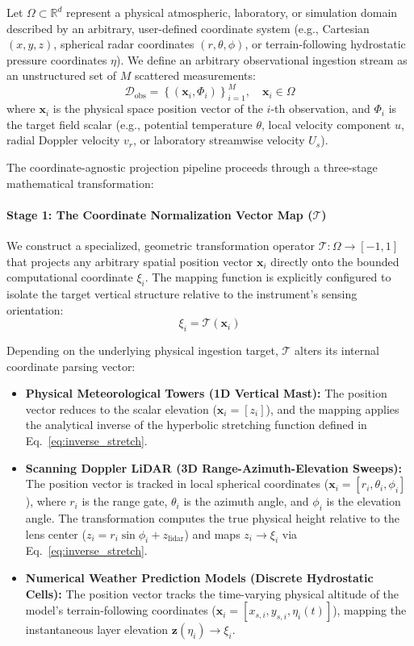 \documentclass[11pt,a4paper]{article}
\begin{document}
Let $\Omega \subset \mathbb{R}^d$ represent a physical atmospheric, laboratory, or simulation domain described by an arbitrary, user-defined coordinate system (e.g., Cartesian $(x,y,z)$, spherical radar coordinates $(r, \theta, \phi)$, or terrain-following hydrostatic pressure coordinates $\eta$). We define an arbitrary observational ingestion stream as an unstructured set of $M$ scattered measurements:
\begin{equation}
\mathcal{D}_{\mathrm{obs}} = \left\{ \left(\mathbf{x}_i, \Phi_i\right) \right\}_{i=1}^M, \quad \mathbf{x}_i \in \Omega
\label{eq:scattered_data_set}
\end{equation}
where $\mathbf{x}_i$ is the physical space position vector of the $i$-th observation, and $\Phi_i$ is the target field scalar (e.g., potential temperature $\theta$, local velocity component $u$, radial Doppler velocity $v_r$, or laboratory streamwise velocity $U_s$).

The coordinate-agnostic projection pipeline proceeds through a three-stage mathematical transformation:

\paragraph{Stage 1: The Coordinate Normalization Vector Map ($\mathcal{T}$)}
We construct a specialized, geometric transformation operator $\mathcal{T}: \Omega \rightarrow [-1, 1]$ that projects any arbitrary spatial position vector $\mathbf{x}_i$ directly onto the bounded computational coordinate $\xi_i$. The mapping function is explicitly configured to isolate the target vertical structure relative to the instrument's sensing orientation:
\begin{equation}
\xi_i = \mathcal{T}(\mathbf{x}_i)
\label{eq:generalized_tau_map}
\end{equation}

Depending on the underlying physical ingestion target, $\mathcal{T}$ alters its internal coordinate parsing vector:
\begin{itemize}
\item \textbf{Physical Meteorological Towers (1D Vertical Mast):} The position vector reduces to the scalar elevation ($\mathbf{x}_i = [z_i]$), and the mapping applies the analytical inverse of the hyperbolic stretching function defined in Eq.~\ref{eq:inverse_stretch}.
\item \textbf{Scanning Doppler LiDAR (3D Range-Azimuth-Elevation Sweeps):} The position vector is tracked in local spherical coordinates ($\mathbf{x}_i = [r_i, \theta_i, \phi_i]$), where $r_i$ is the range gate, $\theta_i$ is the azimuth angle, and $\phi_i$ is the elevation angle. The transformation computes the true physical height relative to the lens center ($z_i = r_i \sin \phi_i + z_{\mathrm{lidar}}$) and maps $z_i \rightarrow \xi_i$ via Eq.~\ref{eq:inverse_stretch}.
\item \textbf{Numerical Weather Prediction Models (Discrete Hydrostatic Cells):} The position vector tracks the time-varying physical altitude of the model's terrain-following coordinates ($\mathbf{x}_i = [x_{s,i}, y_{s,i}, \eta_i(t)]$), mapping the instantaneous layer elevation $\mathbf{z}(\eta_i) \rightarrow \xi_i$.
\end{itemize}
\end{document}

